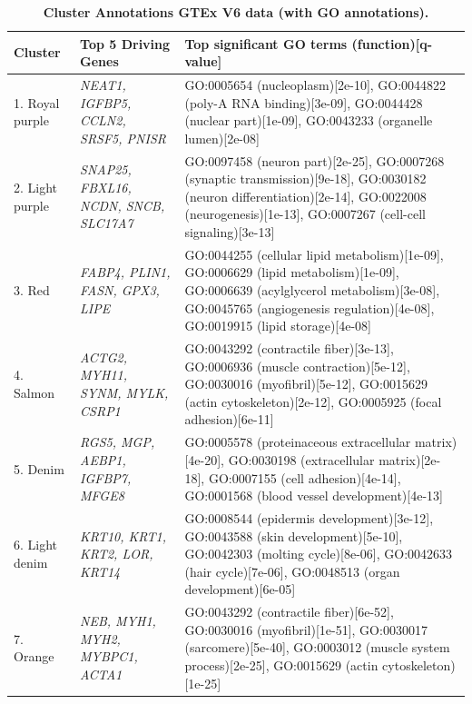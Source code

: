 \documentclass[10pt,letterpaper]{article}
\begin{document}
\clearpage
\begin{table}[!hp]
\begin{adjustwidth}{-2in}{0in} %
\footnotesize
\centering
\caption{\bf Cluster Annotations GTEx V6 data (with GO annotations).}
\renewcommand{\arraystretch}{1.7}
\begin{tabular}{|p{1.0in}|p{1.5in}|p{4.3in}|}
\hline
Cluster & Top 5 Driving \qquad Genes  &  Top significant GO terms (function)[q-value] \\
\hline
1. Royal purple & \textit{NEAT1, IGFBP5, CCLN2, SRSF5, PNISR} & GO:0005654 (nucleoplasm)[2e-10], GO:0044822 (poly-A RNA binding)[3e-09], GO:0044428 (nuclear part)[1e-09], GO:0043233 (organelle lumen)[2e-08]  \\ \hline
2. Light purple & \textit{SNAP25, FBXL16, NCDN, SNCB, SLC17A7} & GO:0097458 (neuron part)[2e-25], GO:0007268 (synaptic transmission)[9e-18], GO:0030182 (neuron differentiation)[2e-14], GO:0022008 (neurogenesis)[1e-13], GO:0007267 (cell-cell signaling)[3e-13]\\ \hline
3. Red & \textit{FABP4, PLIN1, FASN, GPX3, LIPE} & GO:0044255 (cellular lipid metabolism)[1e-09], GO:0006629 (lipid metabolism)[1e-09], GO:0006639 (acylglycerol metabolism)[3e-08], GO:0045765 (angiogenesis regulation)[4e-08], GO:0019915 (lipid storage)[4e-08] \\ \hline
4. Salmon & \textit{ACTG2, MYH11, SYNM, MYLK, CSRP1} & GO:0043292 (contractile fiber)[3e-13], GO:0006936 (muscle contraction)[5e-12], GO:0030016 (myofibril)[5e-12], GO:0015629 (actin cytoskeleton)[2e-12],  GO:0005925 (focal adhesion)[6e-11] \\ \hline
5. Denim & \textit{RGS5, MGP,  AEBP1, IGFBP7, MFGE8} & GO:0005578 (proteinaceous extracellular matrix)[4e-20], GO:0030198 (extracellular matrix)[2e-18], GO:0007155 (cell adhesion)[4e-14], GO:0001568 (blood vessel development)[4e-13] \\ \hline
6. Light denim & \textit{KRT10, KRT1, KRT2, LOR, KRT14} & GO:0008544 (epidermis development)[3e-12], GO:0043588 (skin development)[5e-10], GO:0042303 (molting cycle)[8e-06], GO:0042633 (hair cycle)[7e-06], GO:0048513 (organ development)[6e-05] \\ \hline
7. Orange & \textit{NEB, MYH1, MYH2, MYBPC1, ACTA1} & GO:0043292 (contractile fiber)[6e-52], GO:0030016 (myofibril)[1e-51], GO:0030017 (sarcomere)[5e-40], GO:0003012 (muscle system process)[2e-25], GO:0015629 (actin cytoskeleton)[1e-25] \\ \hline

\end{tabular}
\end{adjustwidth}
\end{table}
\end{document}
